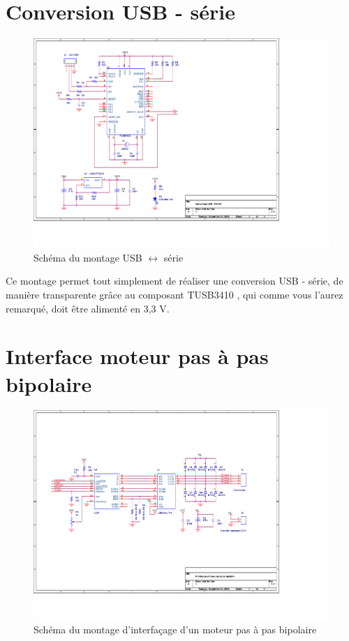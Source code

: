 \documentclass[a4paper]{article}
\begin{document}
\section{Conversion USB - série}

\begin{figure}[H]
	\centering
	\includegraphics[scale=1.00]{Images/Montage_USB_serie}
	\caption{Schéma du montage USB $\leftrightarrow$ série
		\label{Montage_USB_serie}}
\end{figure}

Ce montage permet tout simplement de réaliser une conversion USB - série, de manière transparente grâce au composant TUSB3410 \cite{TUSB3410}, qui comme vous l'aurez remarqué, doit être alimenté en 3,3 V.

\section{Interface moteur pas à pas bipolaire}

\begin{figure}[H]
	\centering
	\includegraphics[scale=1.00, angle=90]{Images/Montage_moteur_pas_a_pas_bipolaire}
	\caption{Schéma du montage d'interfaçage d'un moteur pas à pas bipolaire
		\label{Montage_moteur_pas_a_pas_bipolaire}}
\end{figure}
\end{document}
